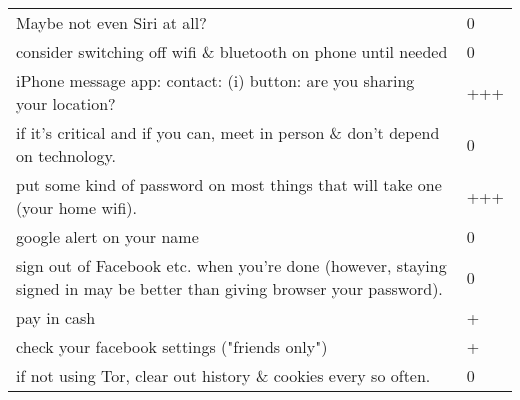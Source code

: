 \documentclass{tufte-handout}
\begin{document}
\begin{tabular}{p{5in}l}
Maybe not even Siri at all? & 0 \\

consider switching off wifi \& bluetooth on phone until needed & 0 \\

iPhone message app: contact: (i) button: are you sharing your location? & +++ \\

if it's critical and if you can, meet in person \& don't depend on technology. & 0 \\

put some kind of password on most things that will take one (your home wifi). & +++ \\

google alert on your name & 0 \\

sign out of Facebook etc. when you're done (however, staying signed in may be better than giving browser your password). & 0 \\

pay in cash & + \\

check your facebook settings ("friends only") & + \\

if not using Tor, clear out history \& cookies every so often. & 0 \\



\end{tabular}
\end{document}

